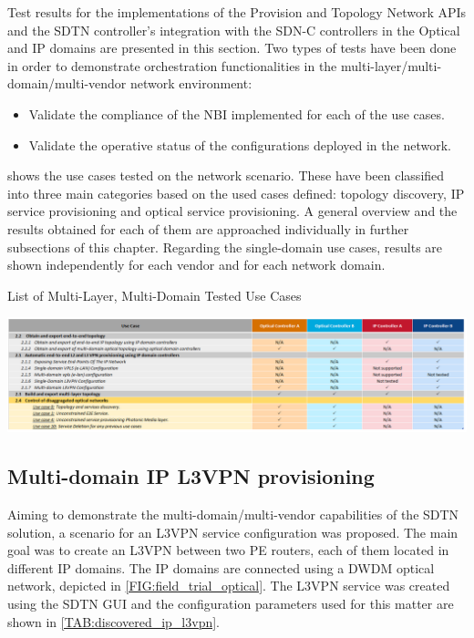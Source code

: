 \documentclass[a4paper,fleqn]{cas-dc}
\begin{document}
Test results for the implementations of the Provision and Topology Network APIs and the SDTN controller’s integration with the SDN-C controllers in the Optical and IP domains are presented in this section. Two types of tests have been done in order to demonstrate orchestration functionalities in the multi-layer/multi-domain/multi-vendor network environment: 
\begin{itemize}
    \item Validate the compliance of the NBI implemented for each of the use cases.
    \item Validate the operative status of the configurations deployed in the network. 
\end{itemize}

 shows the use cases tested on the network scenario. These have been classified into three main categories based on the used cases defined: topology discovery, IP service provisioning and optical service provisioning. A general overview and the results obtained for each of them are approached individually in further subsections of this chapter. Regarding the single-domain use cases, results are shown independently for each vendor and for each network domain.

\begin{table}
	\caption{List of Multi-Layer, Multi-Domain Tested Use Cases}
	\centering
		\includegraphics[scale=0.5]{figs/tested_use_cases.png}
	\label{TAB:tested_use_cases}
\end{table}

\subsection{Multi-domain IP L3VPN provisioning}

Aiming to demonstrate the multi-domain/multi-vendor capabilities of the SDTN solution, a scenario for an L3VPN service configuration was proposed. The main goal was to create an L3VPN between two PE routers, each of them located in different IP domains. The IP domains are connected using a DWDM optical network, depicted in \cref{FIG:field_trial_optical}. The L3VPN service was created using the SDTN GUI and the configuration parameters used for this matter are shown in \cref{TAB:discovered_ip_l3vpn}.
\end{document}
